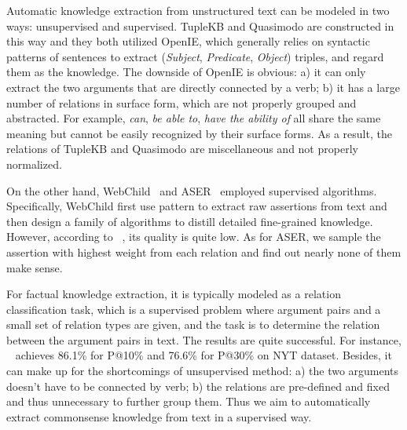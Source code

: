 
Automatic knowledge extraction from unstructured text can be modeled in two ways: unsupervised and supervised. TupleKB and Quasimodo are constructed in this way and they both utilized OpenIE, which generally relies on syntactic patterns of sentences to extract (\textit{Subject}, \textit{Predicate}, \textit{Object}) triples, and regard them as the knowledge. The downside of OpenIE is obvious: a) it can only extract the two arguments that are directly connected by a verb; b) it has a large number of relations in surface form, which are not properly grouped and abstracted. For example, \textit{can}, \textit{be able to}, \textit{have the ability of} all share the same meaning but cannot be easily recognized by their surface forms. As a result, the relations of TupleKB and Quasimodo are miscellaneous and not properly normalized. 

On the other hand, WebChild~\cite{tandon2016commonsense} and ASER~\cite{zhang2019aser} employed supervised algorithms. Specifically, WebChild first use pattern to extract raw assertions from text and then design a family of algorithms to distill detailed fine-grained knowledge. However, according to  ~\citet{romero2019commonsense}, its quality is quite low.
As for ASER, we sample the assertion with highest weight from each relation and find out nearly none of them make sense. 

For factual knowledge extraction, it is typically modeled as a relation classification task, which is a supervised problem where argument pairs and a small set of relation types are given, and the task is to determine the relation between the argument pairs in text. The results are quite successful. For instance, ~\cite{xu2019connecting} achieves 86.1\% for P@10\% and 76.6\% for P@30\% on NYT dataset. Besides, it can make up for the shortcomings of unsupervised method: a) the two arguments doesn't have to be connected by verb; b) the relations are pre-defined and fixed and thus unnecessary to further group them. Thus we aim to automatically extract commonsense knowledge from text in a supervised way. 

